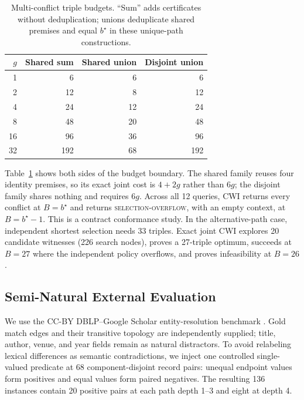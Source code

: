 \documentclass[letterpaper]{article} %
\newcommand{\cwi}{\textsc{CWI}}
\begin{document}
\begin{table}[t]
\centering
\small
\setlength{\tabcolsep}{3.5pt}
\begin{tabular}{rrrr}
\toprule
$g$ & Shared sum & Shared union & Disjoint union \\
\midrule
1  & 6   & 6  & 6 \\
2  & 12  & 8  & 12 \\
4  & 24  & 12 & 24 \\
8  & 48  & 20 & 48 \\
16 & 96  & 36 & 96 \\
32 & 192 & 68 & 192 \\
\bottomrule
\end{tabular}
\caption{Multi-conflict triple budgets. ``Sum'' adds certificates without
deduplication; unions deduplicate shared premises and equal $b^\star$ in these
unique-path constructions.}
\label{tab:budget}
\end{table}

Table~\ref{tab:budget} shows both sides of the budget boundary.  The shared
family reuses four identity premises, so its exact joint cost is $4+2g$ rather
than $6g$; the disjoint family shares nothing and requires $6g$.  Across all
12 queries, \cwi{} returns every conflict at $B=b^\star$ and returns
\textsc{selection-overflow}, with an empty context, at $B=b^\star-1$.  This is
a contract conformance study.  In the alternative-path case, independent
shortest selection needs 33 triples.  Exact joint \cwi{} explores 20 candidate
witnesses (226 search nodes), proves a 27-triple optimum, succeeds at
$B=27$ where the independent policy overflows, and proves infeasibility at
$B=26$.

\subsection{Semi-Natural External Evaluation}

We use the CC-BY DBLP--Google Scholar entity-resolution benchmark
\citep{papadakis2022datasets}.  Gold match edges and their transitive topology
are independently supplied; title, author, venue, and year fields remain as
natural distractors.  To avoid relabeling lexical differences as semantic
contradictions, we inject one controlled single-valued predicate at 68
component-disjoint record pairs: unequal endpoint values form positives and
equal values form paired negatives.  The resulting 136 instances contain
20 positive pairs at each path depth 1--3 and eight at depth 4.
\end{document}
